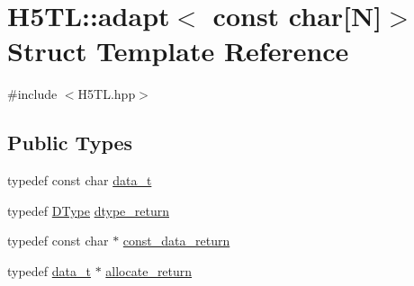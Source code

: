\hypertarget{struct_h5_t_l_1_1adapt_3_01const_01char[_n]_4}{\section{H5\-T\-L\-:\-:adapt$<$ const char\mbox{[}N\mbox{]}$>$ Struct Template Reference}
\label{struct_h5_t_l_1_1adapt_3_01const_01char[_n]_4}
}


{\ttfamily \#include $<$H5\-T\-L.\-hpp$>$}

\subsection*{Public Types}
\begin{DoxyCompactItemize}
\item 
typedef const char \hyperlink{struct_h5_t_l_1_1adapt_3_01const_01char[_n]_4_a74d18aaf246764491c0bb12be80e607b}{data\-\_\-t}
\item 
typedef \hyperlink{class_h5_t_l_1_1_d_type}{D\-Type} \hyperlink{struct_h5_t_l_1_1adapt_3_01const_01char[_n]_4_aa516830e84fe65292c6d1e2c94f73b93}{dtype\-\_\-return}
\item 
typedef const char $\ast$ \hyperlink{struct_h5_t_l_1_1adapt_3_01const_01char[_n]_4_a5053e82858247b9c7497e610f23391a5}{const\-\_\-data\-\_\-return}
\item 
typedef \hyperlink{struct_h5_t_l_1_1adapt_3_01const_01char[_n]_4_a74d18aaf246764491c0bb12be80e607b}{data\-\_\-t} $\ast$ \hyperlink{struct_h5_t_l_1_1adapt_3_01const_01char[_n]_4_ac3d3bf85390126994e3876cda484bbe2}{allocate\-\_\-return}
\end{DoxyCompactItemize}
